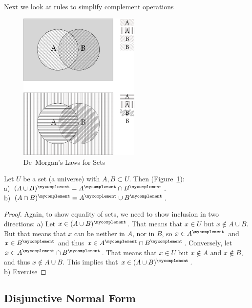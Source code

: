 Next we look at rules to simplify complement operations

\begin{figure}[t]
\begin{center}
\includegraphics[width=6cm]{pic/VennDeMorganLaws.pdf}
\end{center}
\caption{De~Morgan's Laws for Sets}
\label{figdemorganset}
\end{figure}

\begin{thm}
Let $U$ be a set (a universe) with $A,B\subset U$.
Then (Figure~\ref{figdemorganset}):\\
a) $(A\cup B)^\mycomplement=A^\mycomplement\cap B^\mycomplement$.\\
b) $(A\cap B)^\mycomplement=A^\mycomplement\cup B^\mycomplement$.
\end{thm}
\begin{proof}
Again, to show equality of sets, we need to show inclusion in two directions:
a) Let $x\in (A\cup B)^\mycomplement$. That means that $x\in U$ but $x\not\in
A\cup B$. But that means that $x$ can be neither in $A$, nor in $B$, so
$x\in A^\mycomplement$ and $x\in B^\mycomplement$ and thus $x\in
A^\mycomplement\cap B^\mycomplement$.
Conversely, let $x\in A^\mycomplement\cap B^\mycomplement$.
That means that $x\in U$ but $x\not\in A$ and
$x\not\in B$, and thus $x\not\in A\cup B$. This implies that
$x\in(A\cup B)^\mycomplement$.\\
b) Exercise
\end{proof}

\subsection{Disjunctive Normal Form}

